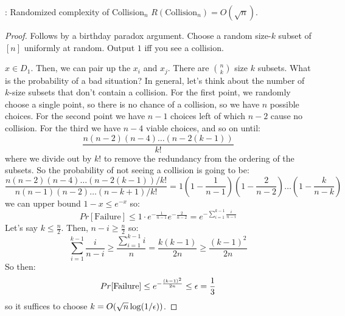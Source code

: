 \begin{propbox}{: Randomized complexity of Collision$_n$}
    $R(\text{Collision}_n) = O(\sqrt{n})$.
\end{propbox}
\begin{proof}
    Follows by a birthday paradox argument. Choose a random size-$k$ subset of $[n]$ uniformly at random. Output $1$ iff you see a collision. 
    
     $x \in D_1$. Then, we can pair up the $x_i$ and $x_j$. There are $\binom{n}{k}$ size $k$ subsets. What is the probability of a bad situation? In general, let's think about the number of $k$-size subsets that don't contain a collision. For the first point, we randomly choose a single point, so there is no chance of a collision, so we have $n$ possible choices. For the second point we have $n-1$ choices left of which $n-2$ cause no collision. For the third we have $n-4$ viable choices, and so on until:
    \begin{equation}
        \frac{n(n-2)(n-4)\ldots(n-2(k-1))}{k!}
    \end{equation}
    where we divide out by $k!$ to remove the redundancy from the ordering of the subsets. So the probability of not seeing a collision is going to be:
    \begin{equation}
        \frac{n(n-2)(n-4)\ldots(n-2(k-1))/k!}{n(n-1)(n-2)\ldots (n-k+1)/k!} = 1\left(1 - \frac{1}{n-1}\right)\left(1 - \frac{2}{n-2}\right) \ldots \left(1 - \frac{k}{n-k}\right)
    \end{equation}
    we can upper bound $1 - x \leq e^{-x}$ so:
    \begin{equation}
        Pr[\text{Failure}] \leq 1 \cdot e^{-\frac{1}{n-1}}e^{-\frac{2}{n-2}} = e^{-\sum_{i=1}^{k-1}\frac{i}{n-i}}
    \end{equation}
    Let's say $k \leq \frac{n}{2}$. Then, $n-i \geq \frac{n}{2}$ so:
    \begin{equation}
        \sum_{i=1}^{k-1}\frac{i}{n-i} \geq \frac{\sum_{i=1}^{k-1}i}{n} = \frac{k(k-1)}{2n} \geq \frac{(k-1)^2}{2n}
    \end{equation}
    So then:
    \begin{equation}
        Pr[\text{Failure}] \leq e^{-\frac{(k-1)^2}{2n}} \leq \epsilon = \frac{1}{3}
    \end{equation}
    so it suffices to choose $k = O(\sqrt{n}\log(1/\epsilon))$. 
\end{proof}

